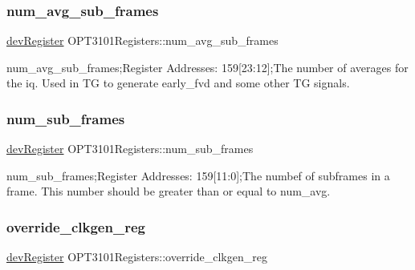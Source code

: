 \mbox{\label{class_o_p_t3101_registers_a4421cd64388f2af7ffcf6fe52e74a06a}} 
\subsubsection{\texorpdfstring{num\+\_\+avg\+\_\+sub\+\_\+frames}{num\_avg\_sub\_frames}}
{\footnotesize\ttfamily \mbox{\hyperlink{classdev_register}{dev\+Register}} O\+P\+T3101\+Registers\+::num\+\_\+avg\+\_\+sub\+\_\+frames}



num\+\_\+avg\+\_\+sub\+\_\+frames;Register Addresses\+: 159\mbox{[}23\+:12\mbox{]};The number of averages for the iq. Used in TG to generate early\+\_\+fvd and some other TG signals. 

\mbox{\label{class_o_p_t3101_registers_ad50dd2b7c80d3da45925f0e510c22a99}} 
\subsubsection{\texorpdfstring{num\+\_\+sub\+\_\+frames}{num\_sub\_frames}}
{\footnotesize\ttfamily \mbox{\hyperlink{classdev_register}{dev\+Register}} O\+P\+T3101\+Registers\+::num\+\_\+sub\+\_\+frames}



num\+\_\+sub\+\_\+frames;Register Addresses\+: 159\mbox{[}11\+:0\mbox{]};The numbef of subframes in a frame. This number should be greater than or equal to num\+\_\+avg. 

\mbox{\label{class_o_p_t3101_registers_a0c481a59621a3bbcd5e54a33e83fdb28}} 
\subsubsection{\texorpdfstring{override\+\_\+clkgen\+\_\+reg}{override\_clkgen\_reg}}
{\footnotesize\ttfamily \mbox{\hyperlink{classdev_register}{dev\+Register}} O\+P\+T3101\+Registers\+::override\+\_\+clkgen\+\_\+reg}



